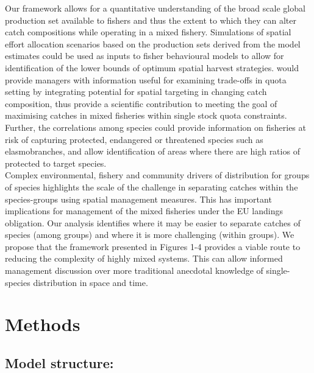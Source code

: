 \documentclass[fleqn,10pt]{wlscirep}
\begin{document}
\begin{linenumbers}
Our framework allows for a quantitative understanding of the broad scale global
production set available to fishers\cite{Reimer2017} and thus the extent to
which they can alter catch compositions while operating in a mixed fishery.
Simulations of spatial effort allocation scenarios based on the production sets
derived from the model estimates could be used as inputs to fisher behavioural
models to allow for identification of the lower bounds of optimum spatial
harvest strategies.  would provide managers with
information useful for examining trade-offs in quota setting by integrating
potential for spatial targeting in changing catch composition, thus provide a
scientific contribution to  meeting the goal of maximising catches in mixed fisheries
within single stock quota constraints\cite{Ulrich2016}. Further, the
correlations among species could provide information on fisheries at risk of
capturing protected, endangered or threatened species such as elasmobranches,
and allow identification of areas where there are high ratios of protected to
target species.\\


Complex environmental, fishery and community drivers of distribution for groups
of species highlights the scale of the challenge in separating catches within
the species-groups using spatial management measures. This has important
implications for management of the mixed fisheries under the EU landings
obligation. Our analysis identifies where it may be easier to separate catches
of species (among groups) and where it is more challenging (within groups). We
propose that the framework presented in Figures 1-4 provides a viable route to
reducing the complexity of highly mixed systems.  This can allow informed
management discussion over more traditional anecdotal knowledge of
single-species distribution in space and time.\\


\section*{Methods\\}

\subsection*{Model structure:\\} 


\end{linenumbers}
\end{document}
